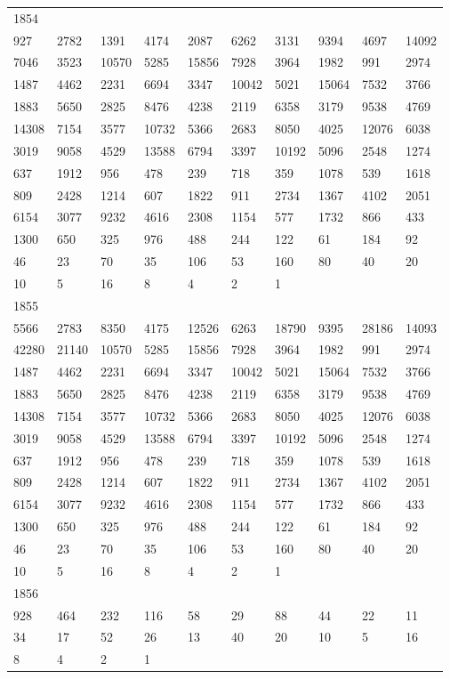 \begin{longtable}{*{10}{l}}
1854&&&&&&&&&\\
927& 2782& 1391& 4174& 2087& 6262& 3131& 9394& 4697& 14092\\
7046& 3523& 10570& 5285& 15856& 7928& 3964& 1982& 991& 2974\\
1487& 4462& 2231& 6694& 3347& 10042& 5021& 15064& 7532& 3766\\
1883& 5650& 2825& 8476& 4238& 2119& 6358& 3179& 9538& 4769\\
14308& 7154& 3577& 10732& 5366& 2683& 8050& 4025& 12076& 6038\\
3019& 9058& 4529& 13588& 6794& 3397& 10192& 5096& 2548& 1274\\
637& 1912& 956& 478& 239& 718& 359& 1078& 539& 1618\\
809& 2428& 1214& 607& 1822& 911& 2734& 1367& 4102& 2051\\
6154& 3077& 9232& 4616& 2308& 1154& 577& 1732& 866& 433\\
1300& 650& 325& 976& 488& 244& 122& 61& 184& 92\\
46& 23& 70& 35& 106& 53& 160& 80& 40& 20\\
10& 5& 16& 8& 4& 2& 1& \\

1855&&&&&&&&&\\
5566& 2783& 8350& 4175& 12526& 6263& 18790& 9395& 28186& 14093\\
42280& 21140& 10570& 5285& 15856& 7928& 3964& 1982& 991& 2974\\
1487& 4462& 2231& 6694& 3347& 10042& 5021& 15064& 7532& 3766\\
1883& 5650& 2825& 8476& 4238& 2119& 6358& 3179& 9538& 4769\\
14308& 7154& 3577& 10732& 5366& 2683& 8050& 4025& 12076& 6038\\
3019& 9058& 4529& 13588& 6794& 3397& 10192& 5096& 2548& 1274\\
637& 1912& 956& 478& 239& 718& 359& 1078& 539& 1618\\
809& 2428& 1214& 607& 1822& 911& 2734& 1367& 4102& 2051\\
6154& 3077& 9232& 4616& 2308& 1154& 577& 1732& 866& 433\\
1300& 650& 325& 976& 488& 244& 122& 61& 184& 92\\
46& 23& 70& 35& 106& 53& 160& 80& 40& 20\\
10& 5& 16& 8& 4& 2& 1& \\

1856&&&&&&&&&\\
928& 464& 232& 116& 58& 29& 88& 44& 22& 11\\
34& 17& 52& 26& 13& 40& 20& 10& 5& 16\\
8& 4& 2& 1& \\


\end{longtable}
